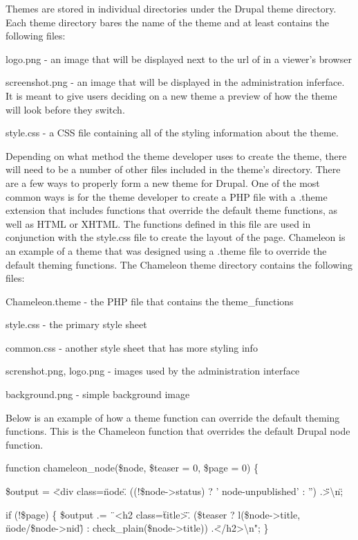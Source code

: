 \documentclass[a4paper,12pt]{report}
\begin{document}
Themes are stored in individual directories under the Drupal theme directory. 
Each theme directory bares the name of the theme and at least contains the following files:

logo.png - an image that will be displayed next to the url of in a viewer's browser

screenshot.png - an image that will be displayed in the administration inferface. 
It is meant to give users deciding on a new theme a preview of how the theme will look before they switch. 

style.css - a CSS file containing all of the styling information about the theme. 


Depending on what method the theme developer uses to create the theme, there will need to be a number of other files included in the theme's directory. 
There are a few ways to properly form a new theme for Drupal. 
One of the most common ways is for the theme developer to create a PHP file with a .theme extension that includes functions that override the default theme functions, as well as HTML or XHTML. 
The functions defined in this file are used in conjunction with the style.css file to create the layout of the page. 
Chameleon is an example of a theme that was designed using a .theme file to override the default theming functions.
The Chameleon theme directory contains the following files: 

Chameleon.theme - the PHP file that contains the theme\_functions 

style.css - the primary style sheet

common.css -  another style sheet that has more styling info

screnshot.png, logo.png - images used by the administration interface

background.png - simple background image


Below is an example of how a theme function can override the default theming functions. 
This is the Chameleon function that overrides the default Drupal node function.

function chameleon\_node(\$node, \$teaser = 0, \$page = 0) \{

  \$output  = \"<div class=\"node\". ((!\$node->status) ? ' node-unpublished' : '') .\"\">\textbackslash n\";

  if (!\$page) \{
    \$output .= \"\ <h2 class=\"title\">\". (\$teaser ? l(\$node->title, \"node/\$node->nid\") : check\_plain(\$node->title)) .\"</h2>\textbackslash n";
  \}
\end{document}
